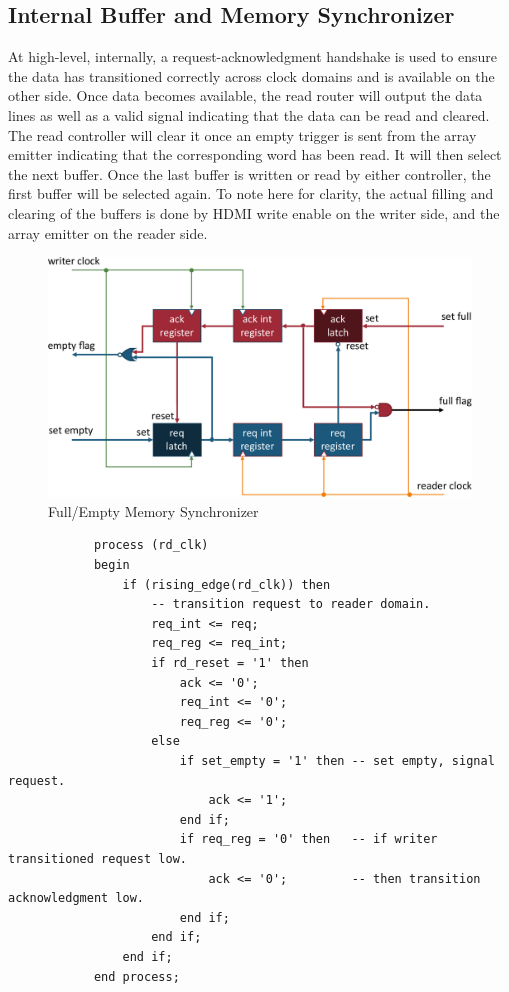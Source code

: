     \subsection{Internal Buffer and Memory Synchronizer}
        \label{Sec:MemorySync}
        At high-level, internally, a request-acknowledgment handshake is used to ensure the data has transitioned correctly across clock domains and is available on the other side. Once data becomes available, the read router will output the data lines as well as a valid signal indicating that the data can be read and cleared. The read controller will clear it once an empty trigger is sent from the array emitter indicating that the corresponding word has been read. It will then select the next buffer. Once the last buffer is written or read by either controller, the first buffer will be selected again. To note here for clarity, the actual filling and clearing of the buffers is done by HDMI write enable on the writer side, and the array emitter on the reader side.

        \begin{figure}
            \centering
            \includegraphics[width=1.0\textwidth]{fig/full_empty_circuit.pdf}
            \caption{Full/Empty Memory Synchronizer}
            \label{fig:sb_arch}
        \end{figure}

        \begin{verbatim}
            process (rd_clk)
            begin
                if (rising_edge(rd_clk)) then
                    -- transition request to reader domain.
                    req_int <= req;
                    req_reg <= req_int;
                    if rd_reset = '1' then
                        ack <= '0';
                        req_int <= '0';
                        req_reg <= '0';
                    else
                        if set_empty = '1' then -- set empty, signal request.
                            ack <= '1';
                        end if;
                        if req_reg = '0' then   -- if writer transitioned request low.
                            ack <= '0';         -- then transition acknowledgment low.
                        end if;
                    end if;
                end if;
            end process;
        \end{verbatim}

